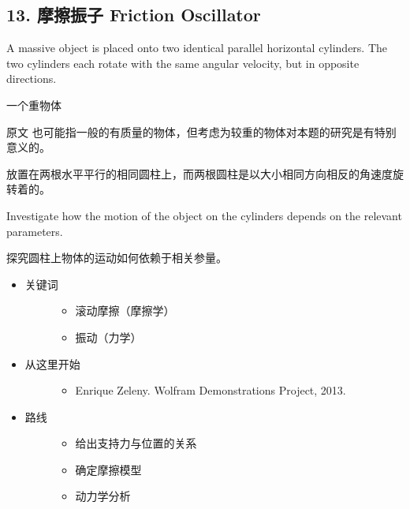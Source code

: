 \documentclass[a4paper,10pt,english]{sphinxmanual}
\begin{document}
\subsection{13. 摩擦振子 Friction Oscillator}
\label{\detokenize{7. Appendix:friction-oscillator}}
A massive object is placed onto two identical parallel horizontal cylinders. The two cylinders each rotate with the same angular velocity, but in opposite directions.

一个重物体 %
\begin{footnote}[7]\sphinxAtStartFootnote
原文  也可能指一般的有质量的物体，但考虑为较重的物体对本题的研究是有特别意义的。
%
\end{footnote} 放置在两根水平平行的相同圆柱上，而两根圆柱是以大小相同方向相反的角速度旋转着的。

Investigate how the motion of the object on the cylinders depends on the relevant parameters.

探究圆柱上物体的运动如何依赖于相关参量。

\noindent{}
\begin{itemize}
\item {} \begin{description}
\item[{关键词}] \leavevmode\begin{itemize}
\item {} 
滚动摩擦（摩擦学）

\item {} 
振动（力学）

\end{itemize}

\end{description}

\item {} \begin{description}
\item[{从这里开始}] \leavevmode\begin{itemize}
\item {} 
Enrique Zeleny.  Wolfram Demonstrations Project, 2013.

\end{itemize}

\end{description}

\item {} \begin{description}
\item[{路线}] \leavevmode\begin{itemize}
\item {} 
给出支持力与位置的关系

\item {} 
确定摩擦模型

\item {} 
动力学分析

\end{itemize}

\end{description}

\end{itemize}
\end{document}
